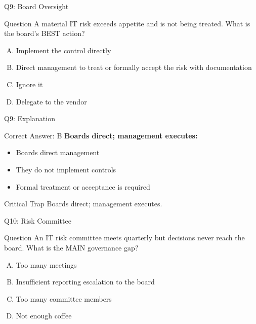 \documentclass{beamer}
\begin{document}
	\begin{frame}{Q9: Board Oversight}
		\begin{block}{Question}
			A material IT risk exceeds appetite and is not being treated. What is the board's BEST action?
		\end{block}
		\begin{enumerate}[(A)]
			\item Implement the control directly
			\item Direct management to treat or formally accept the risk with documentation
			\item Ignore it
			\item Delegate to the vendor
		\end{enumerate}
	\end{frame}
	
	\begin{frame}{Q9: Explanation}
		\begin{block}{Correct Answer: B}
			\textbf{Boards direct; management executes:}
			\begin{itemize}
				\item Boards direct management
				\item They do not implement controls
				\item Formal treatment or acceptance is required
			\end{itemize}
		\end{block}
		\begin{alertblock}{Critical Trap}
			Boards direct; management executes.
		\end{alertblock}
	\end{frame}
	
	\begin{frame}{Q10: Risk Committee}
		\begin{block}{Question}
			An IT risk committee meets quarterly but decisions never reach the board. What is the MAIN governance gap?
		\end{block}
		\begin{enumerate}[(A)]
			\item Too many meetings
			\item Insufficient reporting escalation to the board
			\item Too many committee members
			\item Not enough coffee
		\end{enumerate}
	\end{frame}
	
\end{document}
